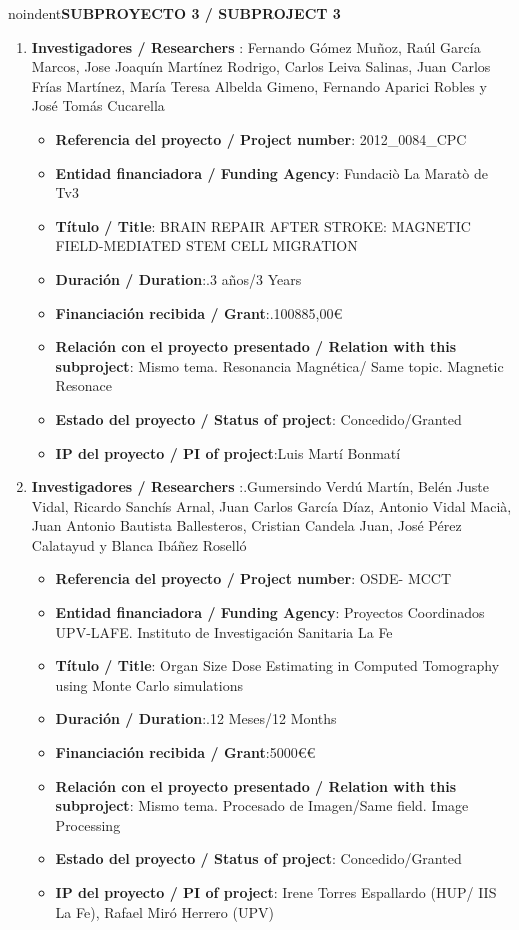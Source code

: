 noindent\textbf{SUBPROYECTO 3 / SUBPROJECT 3}
 \begin{enumerate}
 \item {\bf Investigadores / Researchers }: Fernando Gómez Muñoz, Raúl García Marcos, Jose Joaquín Martínez Rodrigo, Carlos Leiva Salinas, Juan Carlos Frías Martínez, María Teresa Albelda Gimeno, Fernando Aparici Robles y José Tomás Cucarella
 \begin{itemize}
 \item {\bf Referencia del proyecto / Project number}: 2012\_0084\_CPC
 \item {\bf Entidad financiadora / Funding Agency}: Fundaciò La Maratò de Tv3
 \item {\bf Título / Title}:  BRAIN REPAIR AFTER STROKE: MAGNETIC FIELD-MEDIATED STEM CELL MIGRATION
 \item {\bf Duración / Duration}:.3 años/3 Years 
 \item {\bf Financiación recibida / Grant}:.100885,00\euro  
 \item {\bf Relación con el proyecto presentado / Relation with this subproject}: Mismo tema. Resonancia Magnética/ Same topic. Magnetic Resonace
 \item {\bf Estado del proyecto / Status of project}: Concedido/Granted
 \item {\bf IP del proyecto / PI of project}:Luis Martí Bonmatí 
 \end{itemize}

 \item {\bf Investigadores / Researchers }:.Gumersindo Verdú Martín, Belén Juste Vidal, Ricardo Sanchís Arnal, Juan Carlos García Díaz, Antonio Vidal Macià, Juan Antonio Bautista Ballesteros, Cristian Candela Juan, José Pérez Calatayud y Blanca Ibáñez Roselló
 \begin{itemize}
 \item {\bf Referencia del proyecto / Project number}: OSDE- MCCT
 \item {\bf Entidad financiadora / Funding Agency}: Proyectos Coordinados UPV-LAFE. Instituto de Investigación Sanitaria La Fe
 \item {\bf Título / Title}: Organ Size Dose Estimating in Computed Tomography using Monte Carlo simulations 
 \item {\bf Duración / Duration}:.12 Meses/12 Months
 \item {\bf Financiación recibida / Grant}:5000\euro€
 \item {\bf Relación con el proyecto presentado / Relation with this subproject}: Mismo tema. Procesado de Imagen/Same field. Image Processing
 \item {\bf Estado del proyecto / Status of project}: Concedido/Granted
 \item {\bf IP del proyecto / PI of project}: Irene Torres Espallardo (HUP/ IIS La Fe), Rafael Miró Herrero (UPV)
 \end{itemize}


\end{enumerate}
